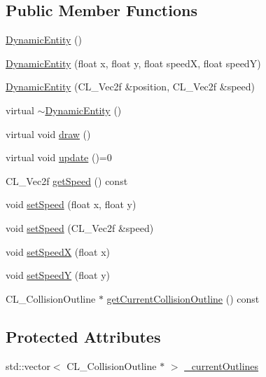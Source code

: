 \subsection*{Public Member Functions}
\begin{DoxyCompactItemize}
\item 
\hyperlink{class_dynamic_entity_a6ccbdfeaa1b88a5377d2c5ecf7ce595f}{DynamicEntity} ()
\item 
\hyperlink{class_dynamic_entity_ae8b6e7256e6b5e67e67c81d3b6399c13}{DynamicEntity} (float x, float y, float speedX, float speedY)
\item 
\hyperlink{class_dynamic_entity_af967268ac7265d7c04107bfda45cdd2c}{DynamicEntity} (CL\_\-Vec2f \&position, CL\_\-Vec2f \&speed)
\item 
virtual \hyperlink{class_dynamic_entity_a2b5f64d1928b49bfa45befad5af8894a}{$\sim$DynamicEntity} ()
\item 
virtual void \hyperlink{class_dynamic_entity_a806fdc6fbe393bc6862d5cf7e6c699e8}{draw} ()
\item 
virtual void \hyperlink{class_dynamic_entity_a80ad0626e1c2167efa049c580c0d466c}{update} ()=0
\item 
CL\_\-Vec2f \hyperlink{class_dynamic_entity_a7a16cf6f1909b9a49c81b4bcf98c29e0}{getSpeed} () const 
\item 
void \hyperlink{class_dynamic_entity_aee86e617eb2fb025d9374b7465d2ae0f}{setSpeed} (float x, float y)
\item 
void \hyperlink{class_dynamic_entity_abfe63f1185985253c177de630e2a6268}{setSpeed} (CL\_\-Vec2f \&speed)
\item 
void \hyperlink{class_dynamic_entity_a33cf8dd82672018465b54705d97a3c58}{setSpeedX} (float x)
\item 
void \hyperlink{class_dynamic_entity_a0c8699292d7f1927a5bd73fcd7e6bcb0}{setSpeedY} (float y)
\item 
CL\_\-CollisionOutline $\ast$ \hyperlink{class_dynamic_entity_a5c5b340d3c1948c8397a70fc5c8d4b6d}{getCurrentCollisionOutline} () const 
\end{DoxyCompactItemize}
\subsection*{Protected Attributes}
\begin{DoxyCompactItemize}
\item 
std::vector$<$ CL\_\-CollisionOutline $\ast$ $>$ \hyperlink{class_dynamic_entity_a43f6941301b3829a979830d376228d92}{\_\-currentOutlines}
\end{DoxyCompactItemize}


